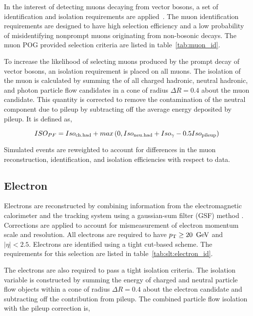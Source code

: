 In the interest of detecting muons decaying from vector bosons, a set of identification and isolation requirements are applied~\cite{Sirunyan:2018fpa}. The muon identification requirements are designed to have high selection efficiency and a low probability of misidentifying nonprompt muons originating from non-bosonic decays. The muon POG provided selection criteria are listed in table~\ref{tab:muon_id}.



\noindent To increase the likelihood of selecting muons produced by the prompt decay of vector bosons, an isolation requirement is placed on all muons. The isolation of the muon is calculated by summing the \pt of all charged hadronic, neutral hadronic, and photon particle flow candidates in a cone of radius $\Delta R = 0.4$ about the muon candidate. This quantity is corrected to remove the contamination of the neutral component due to pileup by subtracting off the average energy deposited by pileup. It is defined as,

\begin{equation}
    ISO_{PF} = Iso_{\rm ch. had} + max \left(0, Iso_{\rm neu. had} +
    Iso_{\gamma} - 0.5 Iso_{\rm pileup}\right)
\end{equation}

Simulated events are reweighted to account for differences in the muon reconstruction, identification, and isolation efficiencies with respect to data.







\subsection{Electron}

Electrons are reconstructed by combining information from the electromagnetic calorimeter and the tracking system using a gaussian-sum
filter (GSF) method \cite{Baffioni:2006cd}.  Corrections are applied to account for mismeasurement of electron momentum scale and resolution. All electrons are required to have $p_{\mathrm{T}} \geq 20~\,\text{Ge\hspace{-.08em}V}$ and $|\eta| < 2.5$.  Electrons are identified using a tight cut-based scheme. The requirements for this selection are listed in table~\ref{tab:slt:electron_id}.



\noindent The electrons are also required to pass a tight isolation criteria. The isolation variable is constructed by summing the energy of charged and neutral particle flow objects within a cone of radius $\Delta R = 0.4$ about the electron candidate and subtracting off the contribution from pileup.  The combined particle flow isolation with the pileup correction is,

